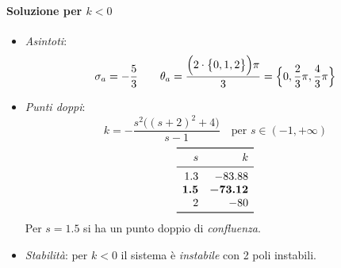 \begin{esercizio}
\paragraph{Soluzione per \(k<0\)}

\begin{itemize}
	\item \emph{Asintoti}:
		\[
			\sigma_a = -\frac{5}{3} \qquad
			\theta_a = \frac{\Bigl(2\cdot\bigl\{0,1,2\bigr\}\Bigr)\pi}{3} = \Bigl\{0,\frac{2}{3}\pi,\frac{4}{3}\pi\Bigr\}
		\]
	\item \emph{Punti doppi}:
		\[
			k = -\frac{s^2\bigl((s+2)^2+4\bigr)}{s-1} \quad
			\text{per } s \in (-1,+\infty)
		\]
		\[\begin{array}{rr}
			\toprule
			s 	 & k 		\\
			\midrule
			1.3 	 & -83.88 	\\
			\bm{1.5} & \bm{-73.12} \\
			2 	 & -80 		\\
			\bottomrule
		\end{array}\]
		Per \(s=1.5\) si ha un punto doppio di \emph{confluenza}.
	\item \emph{Stabilità}: per \(k<0\) il sistema è \emph{instabile} con
		2 poli instabili.
\end{itemize}
\end{esercizio}

